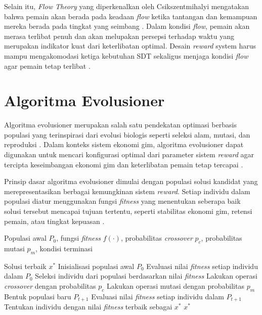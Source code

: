 Selain itu, \textit{Flow Theory} yang diperkenalkan oleh Csikszentmihalyi mengatakan bahwa pemain akan berada pada keadaan \textit{flow} ketika tantangan dan kemampuan mereka berada pada tingkat yang seimbang \citep{2017Inverted}. Dalam kondisi \textit{flow}, pemain akan merasa terlibat penuh dan akan melupakan persepsi terhadap waktu yang merupakan indikator kuat dari keterlibatan optimal. Desain \textit{reward} system harus mampu mengakomodasi ketiga kebutuhan SDT sekaligus menjaga kondisi \textit{flow} agar pemain tetap terlibat \citep{BuilCatalanMartinez2019}.

\section{Algoritma Evolusioner}

Algoritma evolusioner merupakan salah satu pendekatan optimasi berbasis populasi yang terinspirasi dari evolusi biologis seperti seleksi alam, mutasi, dan reproduksi \citep{Herel2022}. Dalam konteks sistem ekonomi gim, algoritma evolusioner dapat digunakan untuk mencari konfigurasi optimal dari parameter sistem \textit{reward} agar tercipta keseimbangan ekonomi gim dan keterlibatan pemain tetap tercapai \citep{MotepalliJacobsen2021}. 

Prinsip dasar algoritma evolusioner dimulai dengan populasi solusi kandidat yang merepresentasikan berbagai kemungkinan sistem \textit{reward}. Setiap individu dalam populasi diatur menggunakan fungsi \textit{fitness} yang menentukan seberapa baik solusi tersebut mencapai tujuan tertentu, seperti stabilitas ekonomi gim, retensi pemain, atau tingkat kepuasan \citep{Bai2024An}. 

\begin{algorithm}[H]
\caption{Kerangka Umum Algoritma Evolusioner untuk Optimasi Sistem \textit{Reward Gim}}
\label{alg:ea-reward}
\begin{algorithmic}[1]
\INPUT  \parbox[t]{\dimexpr\linewidth-\labelwidth}{Populasi awal $P_0$, fungsi \textit{fitness} $f(\cdot)$, probabilitas \textit{crossover} $p_c$, probabilitas mutasi $p_m$, kondisi terminasi}
\OUTPUT Solusi terbaik $x^*$
\State Inisialisasi populasi awal $P_0$
\State Evaluasi nilai \textit{fitness} setiap individu dalam $P_0$
    \State Seleksi individu dari populasi berdasarkan nilai \textit{fitness}
    \State Lakukan operasi \textit{crossover} dengan probabilitas $p_c$
    \State Lakukan operasi mutasi dengan probabilitas $p_m$
    \State Bentuk populasi baru $P_{t+1}$
    \State Evaluasi nilai \textit{fitness} setiap individu dalam $P_{t+1}$
\EndWhile
\State Tentukan individu dengan nilai \textit{fitness} terbaik sebagai $x^*$
\State \Return $x^*$
\end{algorithmic}
\end{algorithm}

